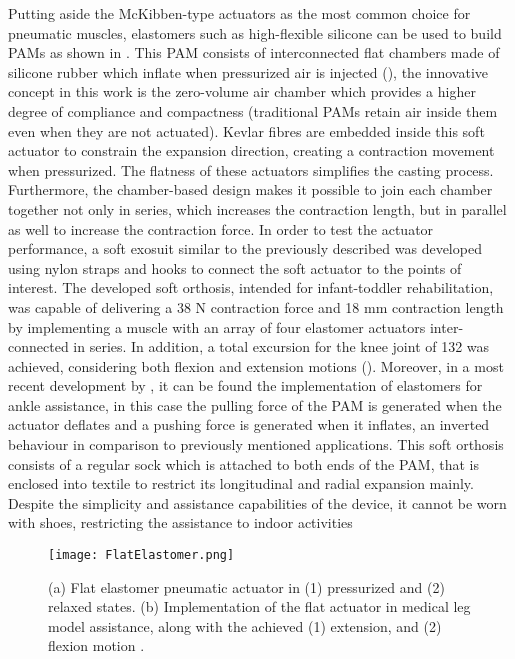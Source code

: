 Putting aside the McKibben-type actuators as the most common choice for pneumatic muscles, elastomers such as high-flexible silicone can be used to build PAMs as shown in \cite{Park2014}. This PAM consists of interconnected flat chambers made of silicone rubber which inflate when pressurized air is injected (), the innovative concept in this work is the zero-volume air chamber which provides a higher degree of compliance and compactness (traditional PAMs retain air inside them even when they are not actuated). Kevlar fibres are embedded inside this soft actuator to constrain the expansion direction, creating a contraction movement when pressurized. The flatness of these actuators simplifies the casting process. Furthermore, the chamber-based design makes it possible to join each chamber together not only in series, which increases the contraction length, but in parallel as well to increase the contraction force. In order to test the actuator performance, a soft exosuit similar to the previously described was developed using nylon straps and hooks to connect the soft actuator to the points of interest. The developed soft orthosis, intended for infant-toddler rehabilitation, was capable of delivering a 38 N contraction force and 18 mm contraction length by implementing a muscle with an array of four elastomer actuators inter-connected in series. In addition, a total excursion for the knee joint of 132\textdegree{} was achieved, considering both flexion and extension motions (). Moreover, in a most recent development by \cite{Low2016}, it can be found the implementation of elastomers for ankle assistance, in this case the pulling force of the PAM is generated when the actuator deflates and a pushing force is generated when it inflates, an inverted behaviour in comparison to previously mentioned applications. This soft orthosis consists of a regular sock which is attached to both ends of the PAM, that is enclosed into textile to restrict its longitudinal and radial expansion mainly. Despite the simplicity and assistance capabilities of the device, it cannot be worn with shoes, restricting the assistance to indoor activities
\begin{figure}[hbtp!]
    \centering
    \texttt{[image: FlatElastomer.png]}
    \caption[(a) Flat elastomer pneumatic actuator in (1) pressurized and (2) relaxed states. (b) Implementation of the flat actuator in medical leg model assistance, along with the achieved (1) extension, and (2) flexion motion.]{(a) Flat elastomer pneumatic actuator in (1) pressurized and (2) relaxed states. (b) Implementation of the flat actuator in medical leg model assistance, along with the achieved (1) extension, and (2) flexion motion \cite{Park2014}. }
    \label{fig:Flat_elastomer}
\end{figure}

